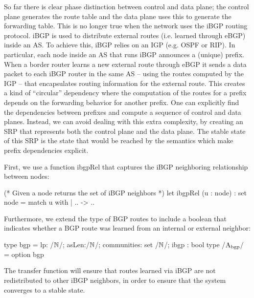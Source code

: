 \documentclass[sigconf,10pt]{acmart}
\begin{document}
So far there is clear phase distinction between control and data
plane; the control plane generates the route table and the data plane
uses this to generate the forwarding table. This is no longer true
when the network uses the iBGP routing protocol. iBGP is used to
distribute external routes (i.e. learned through eBGP) inside an AS.
To achieve this, iBGP relies on an IGP (e.g. OSPF or RIP). In
particular, each node inside an AS that runs iBGP announces a (unique)
prefix. When a border router learns a new external route through eBGP
it sends a data packet to each iBGP router in the same AS -- using the
routes computed by the IGP -- that encapsulates routing information
for the external route. This creates a kind of ``circular'' dependency
where the computation of the routes for a prefix depends on the
forwarding behavior for another prefix. One can explicitly find the
dependencies between prefixes and compute a sequence of control and
data planes. Instead, we can avoid dealing with this extra complexity,
by creating an SRP that represents both the control plane and the data
plane. The stable state of this SRP is the state that would be
reached by the semantics which make prefix dependencies explicit.

First, we use a function ibgpRel that captures the iBGP neighboring relationship between nodes:

\begin{ocamlcode}
  (* Given a node returns the set of iBGP neighbors *)
  let ibgpRel (u : node) : set node =
    match u with
    | .. -> {..}
  \end{ocamlcode}

  Furthermore, we extend the type of BGP routes to include a boolean
  that indicates whether a BGP route was learned from an internal or
  external neighbor:
  
  \begin{ocamlcode}
    type bgp = {lp: /$\mathbb{N}$/; asLen:/$\mathbb{N}$/; communities: set /$\mathbb{N}$/; ibgp : bool}
    type /$\mathrm{A}_{\mathrm{bgp}}$/ = option bgp
  \end{ocamlcode}
  
  The transfer function will ensure that routes learned via iBGP are
  not redistributed to other iBGP neighbors, in order to ensure that
  the system converges to a stable state.
\end{document}
